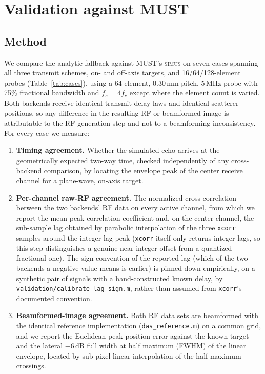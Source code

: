 \documentclass[11pt]{article}
\newcommand{\code}[1]{\texttt{#1}}
\newcommand{\must}{MUST}
\begin{document}
\section{Validation against \must}
\label{sec:validation}

\subsection{Method}

We compare the analytic fallback against \must's \textsc{simus} on seven
cases spanning all three transmit schemes, on- and off-axis targets, and
16/64/128-element probes (Table~\ref{tab:cases}), using a 64-element,
0.30\,mm-pitch, 5\,MHz probe with 75\% fractional bandwidth and $f_s = 4
f_c$ except where the element count is varied. Both backends receive
identical transmit delay laws and identical scatterer positions, so any
difference in the resulting RF or beamformed image is attributable to the
RF generation step and not to a beamforming inconsistency. For every case
we measure:

\begin{enumerate}[leftmargin=*]
  \item \textbf{Timing agreement.} Whether the simulated echo arrives at the
  geometrically expected two-way time, checked independently of any
  cross-backend comparison, by locating the envelope peak of the center
  receive channel for a plane-wave, on-axis target.
  \item \textbf{Per-channel raw-RF agreement.} The normalized cross-correlation
  between the two backends' RF data on every active channel, from which we
  report the mean peak correlation coefficient and, on the center channel,
  the sub-sample lag obtained by parabolic interpolation of the three
  \code{xcorr} samples around the integer-lag peak (\code{xcorr} itself only
  returns integer lags, so this step distinguishes a genuine near-integer
  offset from a quantized fractional one). The sign convention of the
  reported lag (which of the two backends a negative value means is
  earlier) is pinned down empirically, on a synthetic pair of signals with
  a hand-constructed known delay, by
  \code{validation/calibrate\_lag\_sign.m}, rather than assumed from
  \code{xcorr}'s documented convention.
  \item \textbf{Beamformed-image agreement.} Both RF data sets are
  beamformed with the identical reference implementation
  (\code{das\_reference.m}) on a common grid, and we report the Euclidean
  peak-position error against the known target and the lateral $-6$\,dB
  full width at half maximum (FWHM) of the linear envelope, located by
  sub-pixel linear interpolation of the half-maximum crossings.
\end{enumerate}
\end{document}
